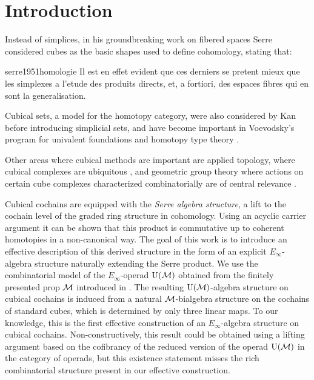 
\section{Introduction} \label{s:introduction}

Instead of simplices, in his groundbreaking work on fibered spaces Serre considered cubes as the basic shapes used to define cohomology, stating that:

\begin{displaycquote}[p.431]{serre1951homologie}
	Il est en effet evident que ces derniers se pretent mieux que les simplexes a l'etude des produits directs, et, a fortiori, des espaces fibres qui en sont la generalisation.
\end{displaycquote}

Cubical sets, a model for the homotopy category, were also considered by Kan \cite{kan1955abstract, kan1956abstract} before introducing simplicial sets, and have become important in Voevodsky's program for univalent foundations and homotopy type theory \cite{kapulkin2020straightening, mortberg2017cubical}.

Other areas where cubical methods are important are applied topology, where cubical complexes are ubiquitous \cite{tomasz2004computational}, and geometric group theory where actions on certain cube complexes characterized combinatorially are of central relevance \cite{gromov1987hyperbolic, agol2013haken}.

Cubical cochains are equipped with the \textit{Serre algebra structure}, a lift to the cochain level of the graded ring structure in cohomology.
Using an acyclic carrier argument it can be shown that this product is commutative up to coherent homotopies in a non-canonical way.
The goal of this work is to introduce an effective description of this derived structure in the form of an explicit $E_\infty$-algebra structure naturally extending the Serre product.
We use the combinatorial model of the $E_\infty$-operad ${\operatorname{U}(\mathcal{M})}$ obtained from the finitely presented prop $\mathcal{M}$ introduced in \cite{medina2020prop1}.
The resulting ${\operatorname{U}(\mathcal{M})}$-algebra structure on cubical cochains is induced from a natural $\mathcal{M}$-bialgebra structure on the cochains of standard cubes, which is determined by only three linear maps.
To our knowledge, this is the first effective construction of an $E_\infty$-algebra structure on cubical cochains.
Non-constructively, this result could be obtained using a lifting argument based on the cofibrancy of the reduced version of the operad ${\operatorname{U}(\mathcal{M})}$ in the category of operads, but this existence statement misses the rich combinatorial structure present in our effective construction.

